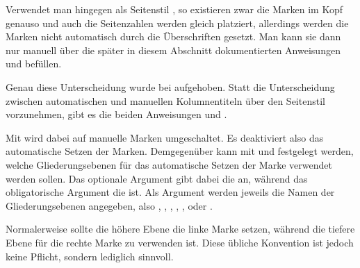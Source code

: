 {\begin{Explain}
      Verwendet man hingegen als Seitenstil
      , so existieren zwar die Marken im Kopf
      genauso und auch die Seitenzahlen werden gleich platziert, allerdings
      werden die Marken nicht automatisch durch die Überschriften gesetzt. Man
      kann sie dann nur manuell über die später in diesem Abschnitt
      dokumentierten Anweisungen
       und
       befüllen.
    \end{Explain}\par%
  }{%
  }%
  Genau diese Unterscheidung wurde bei %
  \iffalse \Package{scrpage2} und nun auch bei \fi%
  \hyperref[cha:scrlayer]{}
  aufgehoben. Statt die Unterscheidung zwischen
  automatischen und manuellen
  Kolumnentiteln über den Seitenstil vorzunehmen, gibt es die beiden
  Anweisungen  und .

  Mit  wird dabei auf manuelle
  Marken umgeschaltet. Es deaktiviert also das automatische Setzen der
  Marken. Demgegenüber kann mit 
  und  festgelegt werden, welche Gliederungsebenen für das
  automatische Setzen der Marke verwendet werden sollen. Das optionale
  Argument gibt dabei die  an,
  während das obligatorische Argument die  ist. Als Argument werden jeweils die Namen der Gliederungsebenen
  angegeben, also , , ,
  , ,  oder
  .

  Normalerweise sollte die höhere Ebene die linke Marke setzen, während die
  tiefere Ebene für die rechte Marke zu verwenden ist. Diese übliche
  Konvention ist jedoch keine Pflicht, sondern lediglich sinnvoll.

